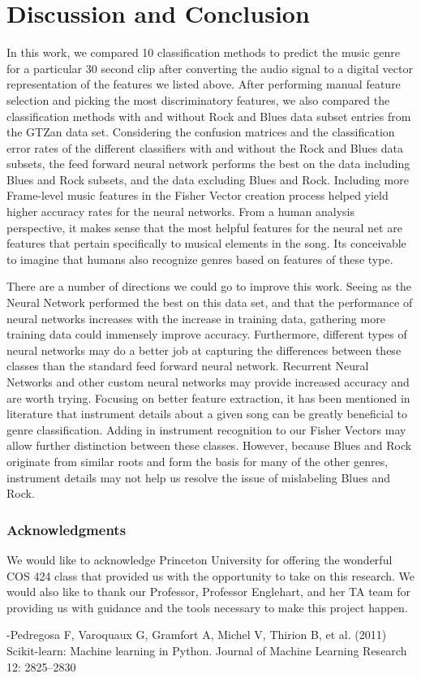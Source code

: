 \documentclass{article} %
\begin{document}
\section{Discussion and Conclusion}
In this work, we compared 10 classification methods to predict the music genre for a particular 30 second clip after converting the audio signal to a digital vector representation of the features we listed above. After performing manual feature selection and picking the most discriminatory features, we also compared the classification methods with and without Rock and Blues data subset entries from the GTZan data set. Considering the confusion matrices and the classification error rates of the different classifiers with and without the Rock and Blues data subsets, the feed forward neural network performs the best on the data including Blues and Rock subsets, and the data excluding Blues and Rock. Including more Frame-level music features in the Fisher Vector creation process helped yield higher accuracy rates for the neural networks. From a human analysis perspective, it makes sense that the most helpful features for the neural net are features that pertain specifically to musical elements in the song. Its conceivable to imagine that humans also recognize genres based on features of these type.

There are a number of directions we could go to improve this work. Seeing as the Neural Network performed the best on this data set, and that the performance of neural networks increases with the increase in training data, gathering more training data could immensely improve accuracy. Furthermore, different types of neural networks may do a better job at capturing the differences between these classes than the standard feed forward neural network. Recurrent Neural Networks and other custom neural networks may provide increased accuracy and are worth trying. Focusing on better feature extraction, it has been mentioned in literature that instrument details about a given song can be greatly beneficial to genre classification. Adding in instrument recognition to our Fisher Vectors may allow further distinction between these classes. However, because Blues and Rock originate from similar roots and form the basis for many of the other genres, instrument details may not help us resolve the issue of mislabeling Blues and Rock.

\subsubsection*{Acknowledgments}
We would like to acknowledge Princeton University for offering the wonderful COS 424 class that provided us with the opportunity to take on this research. We would also like to thank our Professor, Professor Englehart, and her TA team for providing us with guidance and the tools necessary to make this project happen.


-Pedregosa F, Varoquaux G, Gramfort A, Michel V, Thirion B, et al. (2011) Scikit-learn: Machine
learning in Python. Journal of Machine Learning Research 12: 2825–2830
\end{document}
